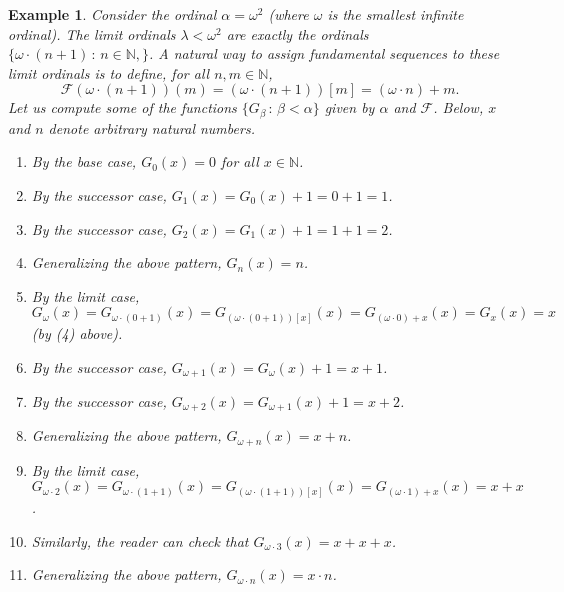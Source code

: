 \documentclass{article}
\newtheorem{example}[theorem]{Example}
\begin{document}
\begin{example}
    Consider the ordinal $\alpha=\omega^2$ (where $\omega$ is the smallest infinite
    ordinal).
    The limit ordinals $\lambda<\omega^2$ are exactly the ordinals
    $\{\omega\cdot (n+1)\,:\,n\in\mathbb N,\}$.
    A natural way to assign fundamental sequences to these limit ordinals is to define,
    for all $n,m\in\mathbb N$,
    \[
        \mathcal F(\omega\cdot(n+1))(m) = (\omega\cdot(n+1))[m] = (\omega\cdot n)+m.
    \]
    Let us compute some of the functions $\{G_{\beta}\,:\,\beta<\alpha\}$
    given by $\alpha$ and $\mathcal F$. Below, $x$ and $n$
    denote arbitrary natural numbers.
    \begin{enumerate}
        \item
        By the base case, $G_0(x)=0$ for all $x\in\mathbb N$.
        \item
        By the successor case, $G_1(x)=G_0(x)+1=0+1=1$.
        \item
        By the successor case, $G_2(x)=G_1(x)+1=1+1=2$.
        \item
        Generalizing the above pattern, $G_n(x)=n$.
        \item
        By the limit case,
        $G_\omega(x)=G_{\omega\cdot(0+1)}(x)
        =G_{(\omega\cdot(0+1))[x]}(x)=G_{(\omega\cdot 0)+x}(x)
        =G_x(x)=x$ (by (4) above).
        \item
        By the successor case, $G_{\omega+1}(x)=G_{\omega}(x)+1=x+1$.
        \item
        By the successor case, $G_{\omega+2}(x)=G_{\omega+1}(x)+1=x+2$.
        \item
        Generalizing the above pattern, $G_{\omega+n}(x)=x+n$.
        \item
        By the limit case,
        $G_{\omega\cdot 2}(x)=G_{\omega\cdot(1+1)}(x)
        =G_{(\omega\cdot(1+1))[x]}(x)=G_{(\omega\cdot 1)+x}(x)
        =x+x$.
        \item
        Similarly, the reader can check that $G_{\omega\cdot 3}(x)=x+x+x$.
        \item
        Generalizing the above pattern, $G_{\omega\cdot n}(x)=x\cdot n$.
    \end{enumerate}
\end{example}
\end{document}
